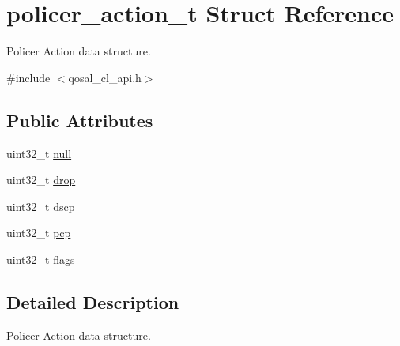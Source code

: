 \hypertarget{structpolicer__action__t}{\section{policer\-\_\-action\-\_\-t Struct Reference}
\label{structpolicer__action__t}
}


Policer Action data structure.  




{\ttfamily \#include $<$qosal\-\_\-cl\-\_\-api.\-h$>$}

\subsection*{Public Attributes}
\begin{DoxyCompactItemize}
\item 
uint32\-\_\-t \hyperlink{structpolicer__action__t_aba06d862c7402db050b118d8b2ce5806}{null}
\item 
uint32\-\_\-t \hyperlink{structpolicer__action__t_a88142da078f1f4a4fc58d237fe1c4f72}{drop}
\item 
uint32\-\_\-t \hyperlink{structpolicer__action__t_a6ea36f2d6f975b01d8c47c12240056eb}{dscp}
\item 
uint32\-\_\-t \hyperlink{structpolicer__action__t_a85f7392c987b5c828a2ac57c29ec8438}{pcp}
\item 
uint32\-\_\-t \hyperlink{structpolicer__action__t_a7363bf3022ed06fc1c65a1cbd8cd9669}{flags}
\end{DoxyCompactItemize}


\subsection{Detailed Description}
Policer Action data structure. 

